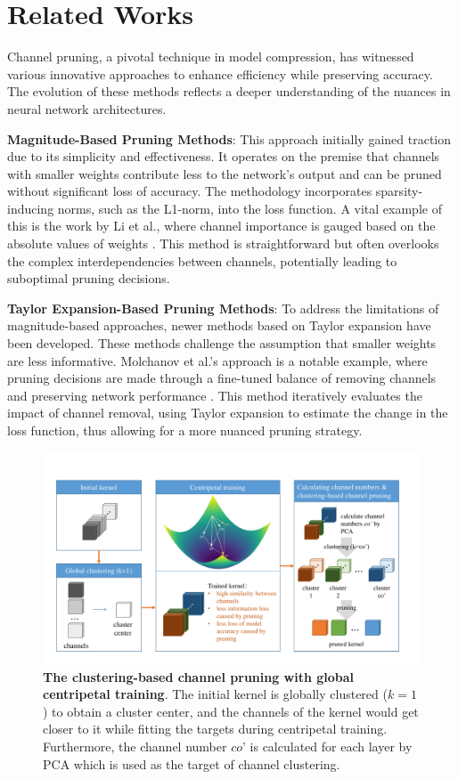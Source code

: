 \documentclass[sigconf, 10pt]{acmart}
\begin{document}
\section{Related Works}\label{sec2}

Channel pruning, a pivotal technique in model compression, has witnessed various innovative approaches to enhance efficiency while preserving accuracy. The evolution of these methods reflects a deeper understanding of the nuances in neural network architectures.

\textbf{Magnitude-Based Pruning Methods}: This approach initially gained traction due to its simplicity and effectiveness. It operates on the premise that channels with smaller weights contribute less to the network’s output and can be pruned without significant loss of accuracy. The methodology incorporates sparsity-inducing norms, such as the L1-norm, into the loss function. A vital example of this is the work by Li et al., where channel importance is gauged based on the absolute values of weights \cite{18}. This method is straightforward but often overlooks the complex interdependencies between channels, potentially leading to suboptimal pruning decisions.

\textbf{Taylor Expansion-Based Pruning Methods}: To address the limitations of magnitude-based approaches, newer methods based on Taylor expansion have been developed. These methods challenge the assumption that smaller weights are less informative. Molchanov et al.'s approach is a notable example, where pruning decisions are made through a fine-tuned balance of removing channels and preserving network performance \cite{20}. This method iteratively evaluates the impact of channel removal, using Taylor expansion to estimate the change in the loss function, thus allowing for a more nuanced pruning strategy.

\begin{figure}[t]
  \centering
  \includegraphics[width=\linewidth]{Fig3.pdf}
   \caption{\textbf{The clustering-based channel pruning with global centripetal training}. The initial kernel is globally clustered ($k=1$) to obtain a cluster center, and the channels of the kernel would get closer to it while fitting the targets during centripetal training. Furthermore, the channel number $\textit{co'}$ is calculated for each layer by PCA which is used as the target of channel clustering.}
   \label{fig:3}
\end{figure}
\end{document}
